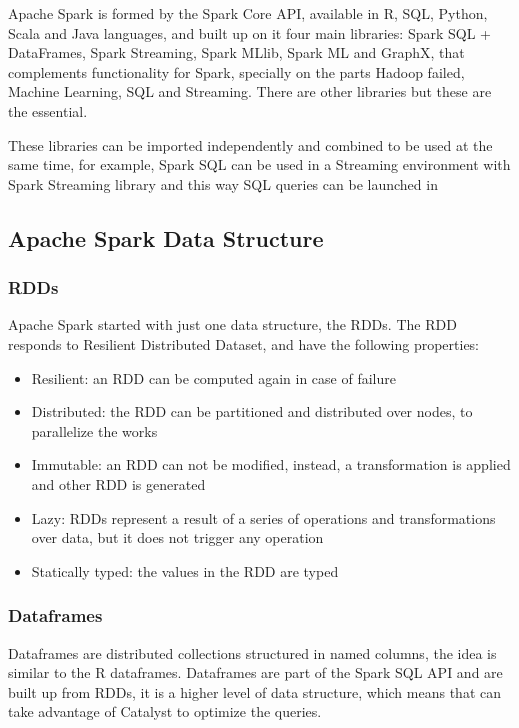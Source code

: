 \documentclass[11pt]{book} %
\begin{document}
      Apache Spark is formed by the Spark Core API, available in R, SQL, Python, Scala and Java languages, and built up on it four main libraries: Spark SQL + DataFrames, Spark Streaming, Spark MLlib, Spark ML and GraphX, that complements functionality for Spark, specially on the parts Hadoop failed, Machine Learning, SQL and Streaming. There are other libraries but these are the essential.

      These libraries can be imported independently and combined to be used at the same time, for example, Spark SQL can be used in a Streaming environment with Spark Streaming library and this way SQL queries can be launched in

    \subsection{Apache Spark Data Structure}

      \subsubsection{RDDs}

        Apache Spark started with just one data structure, the RDDs. The RDD responds to Resilient Distributed Dataset, and have the following properties:

        \begin{itemize}
          \item Resilient: an RDD can be computed again in case of failure
          \item Distributed: the RDD can be partitioned and distributed over nodes, to parallelize the works
          \item Immutable: an RDD can not be modified, instead, a transformation is applied and other RDD is generated
          \item Lazy: RDDs represent a result of a series of operations and transformations over data, but it does not trigger any operation
          \item Statically typed: the values in the RDD are typed
        \end{itemize}

      \subsubsection{Dataframes}

        Dataframes are distributed collections structured in named columns, the idea is similar to the R dataframes. Dataframes are part of the Spark SQL API and are built up from RDDs, it is a higher level of data structure, which means that can take advantage of Catalyst to optimize the queries.
\end{document}
